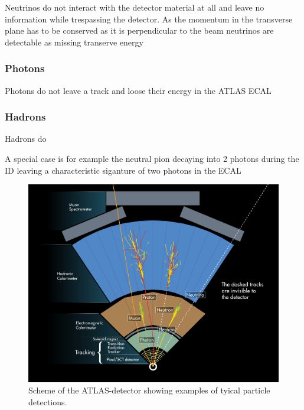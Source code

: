 Neutrinos do not interact with the detector material at all and leave no information while trespassing the detector. As the momentum in the transverse plane has to be conserved as it is perpendicular to the beam neutrinos are detectable as missing transerve energy


\subsubsection{Photons}

Photons do not leave a track and loose their energy in the ATLAS ECAL

\subsubsection{Hadrons}

Hadrons do

A special case is for example the neutral pion decaying into 2 photons during the ID leaving a characteristic siganture of two photons in the ECAL



\begin{figure}[htbp]
  \centering
  \includegraphics[scale=0.6]{figures_LHC/atlas-abstract}
  \caption[Scheme of the ATLAS-detector's detection procedure]{Scheme of the ATLAS-detector showing examples of tyical particle detections. \cite{Pequenao:1095924}}
  \label{fig:atlas_sketch}
\end{figure}
